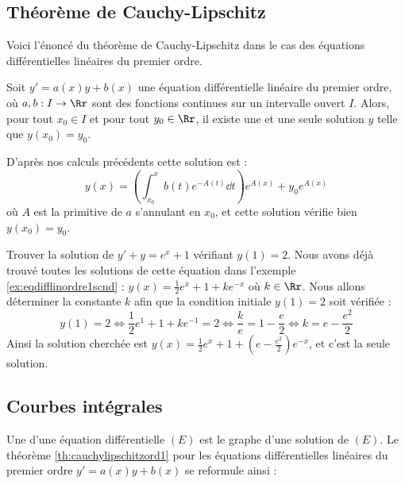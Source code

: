 \documentclass[class=report,crop=false]{standalone}
\begin{document}
\subsection{Théorème de Cauchy-Lipschitz}


Voici l'énoncé du théorème de Cauchy-Lipschitz dans le cas des
équations différentielles linéaires du premier ordre.
\begin{theoreme}
\label{th:cauchylipschitzord1}
Soit $y'=a(x)y + b(x)$ une équation différentielle linéaire du premier ordre,
où $a,b : I \to \Rr$ sont des fonctions continues sur un intervalle ouvert $I$.
Alors, pour tout $x_0 \in I$ et pour tout $y_0 \in \Rr$, il existe une et une
seule solution $y$ telle que $y(x_0)=y_0$.
\end{theoreme}

D'après nos calculs précédents cette solution est :
$$y(x) = \left(\int_{x_0}^x b(t)e^{-A(t)}\dd t \right)e^{A(x)} + y_0e^{A(x)}$$
où $A$ est la primitive de $a$ s'annulant en $x_0$, et cette solution vérifie bien $y(x_0)=y_0$.


\begin{exemple}
Trouver la solution de $y'+y = e^x+1$ vérifiant $y(1)=2$.
Nous avons déjà trouvé toutes les solutions de cette équation dans l'exemple
\ref{ex:eqdifflinordre1scnd} : $y(x) = \frac12e^{x}+1 + k e^{-x}$
où $k\in\Rr$. Nous allons déterminer la constante $k$ afin que la condition initiale
$y(1)=2$ soit vérifiée :
$$y(1)=2 \iff \frac12e^{1}+1 + k e^{-1} = 2 \iff \frac{k}{e} = 1 - \frac{e}{2}
\iff k = e - \frac{e^2}{2}$$
Ainsi la solution cherchée est $y(x) = \frac12e^{x}+1 + \left(e - \frac{e^2}{2}\right)e^{-x}$,
et c'est la seule solution.
\end{exemple}

\subsection{Courbes intégrales}

Une  d'une équation différentielle $(E)$
est le graphe d'une solution de $(E)$.
Le théorème \ref{th:cauchylipschitzord1} pour les équations
différentielles linéaires du premier ordre $y'=a(x)y + b(x)$
se reformule ainsi :
\end{document}
